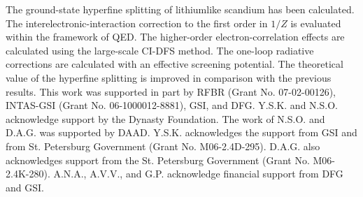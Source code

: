\documentclass[preprint,aps,pra,showpacs,floatfix]{revtex4}
\begin{document}
The ground-state hyperfine splitting of lithiumlike scandium has been calculated.
The interelectronic-interaction correction to the first order in $1/Z$ is evaluated
within the framework of QED. The higher-order electron-correlation effects are calculated
using the large-scale CI-DFS method. The one-loop radiative corrections are calculated
with an effective screening potential. The theoretical value of the hyperfine splitting
is improved in comparison with the previous results.
%
%
\acknowledgments
This work was supported in part by RFBR (Grant No. 07-02-00126), INTAS-GSI
(Grant No. 06-1000012-8881), GSI, and DFG.
Y.S.K. and N.S.O. acknowledge support by the Dynasty Foundation.
The work of N.S.O. and D.A.G. was supported by DAAD.
Y.S.K. acknowledges the support from GSI and from St. Petersburg Government
(Grant No. M06-2.4D-295).
D.A.G. also acknowledges support from the St. Petersburg Government
(Grant No. M06-2.4K-280).
A.N.A., A.V.V., and G.P. acknowledge financial support from DFG and GSI.
%
%
\end{document}
